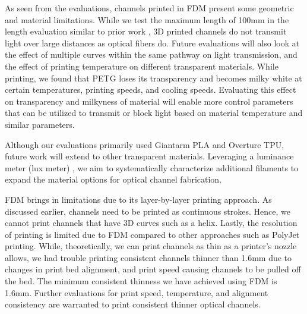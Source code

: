 As seen from the evaluations, channels printed in FDM present some geometric and material limitations. While we test the maximum length of 100mm in the length evaluation similar to prior work \cite{printed_optics_2012}, 3D printed channels do not transmit light over large distances as optical fibers do. 
Future evaluations will also look at the effect of multiple curves within the same pathway on light transmission, and the effect of printing temperature on different transparent materials. While printing, we found that PETG loses its transparency and becomes milky white at certain temperatures, printing speeds, and cooling speeds. Evaluating this effect on transparency and milkyness of material will enable more control parameters that can be utilized to transmit or block light based on material temperature and similar parameters.

Although our evaluations primarily used Giantarm PLA and Overture TPU, future work will extend to other transparent materials. Leveraging a luminance meter (lux meter) \cite{gandhi20173d}, we aim to systematically characterize additional filaments to expand the material options for optical channel fabrication.


FDM brings in limitations due to its layer-by-layer printing approach. As discussed earlier, channels need to be printed as continuous strokes. Hence, we cannot print channels that have 3D curves such as a helix.
Lastly, the resolution of printing is limited due to FDM compared to other approaches such as PolyJet printing.
While, theoretically, we can print channels as thin as a printer's nozzle allows, we had trouble printing consistent channels thinner than 1.6mm due to changes in print bed alignment, and print speed causing channels to be pulled off the bed.
The minimum consistent thinness we have achieved using FDM is 1.6mm. Further evaluations for print speed, temperature, and alignment consistency are warranted to print consistent thinner optical channels.

